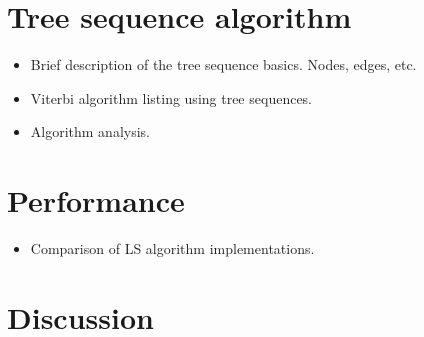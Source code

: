 \documentclass{article}
\begin{document}
\section{Tree sequence algorithm}

\begin{itemize}
\item Brief description of the tree sequence basics. Nodes, edges, etc.
\item Viterbi algorithm listing using tree sequences.
\item Algorithm analysis.
\end{itemize}

\section{Performance}

\begin{itemize}
\item Comparison of LS algorithm implementations.
\end{itemize}


\section{Discussion}


\end{document}
